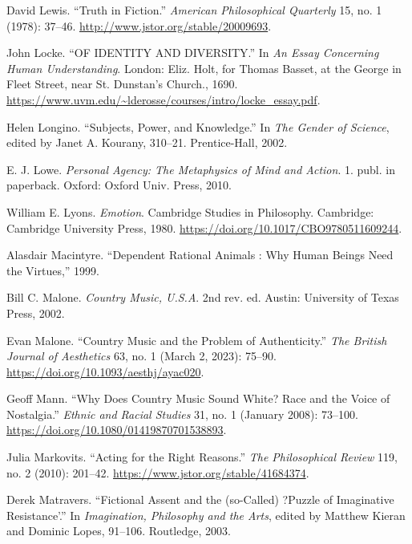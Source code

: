 \documentclass[phdthesis,12pt,final,a4paper]{wuthesis}
\newlength{\cslhangindent}
\newenvironment{CSLReferences}[2] %
{\begin{list}{}{%
	\setlength{\itemindent}{0pt}
	\setlength{\leftmargin}{0pt}
	\setlength{\parsep}{0pt}
	\ifodd #1
	\setlength{\leftmargin}{\cslhangindent}
	\setlength{\itemindent}{-1\cslhangindent}
	\fi
	\setlength{\itemsep}{#2\baselineskip}}}
{\end{list}}
\theoremstyle{definition}
\theoremstyle{definition}
\theoremstyle{definition}
\theoremstyle{definition}
\theoremstyle{remark}
\begin{document}
\begin{CSLReferences}{1}{0}
David Lewis. {``Truth in {Fiction}.''} \emph{American Philosophical Quarterly} 15, no. 1 (1978): 37--46. \url{http://www.jstor.org/stable/20009693}.

John Locke. {``{OF IDENTITY AND DIVERSITY}.''} In \emph{An {Essay Concerning Human Understanding}}. London: Eliz. Holt, for Thomas Basset, at the George in Fleet Street, near St. Dunstan's Church., 1690. \url{https://www.uvm.edu/~lderosse/courses/intro/locke_essay.pdf}.

Helen Longino. {``Subjects, {Power}, and {Knowledge}.''} In \emph{The {Gender} of {Science}}, edited by Janet A. Kourany, 310--21. Prentice-Hall, 2002.

E. J. Lowe. \emph{Personal Agency: The Metaphysics of Mind and Action}. 1. publ. in paperback. Oxford: Oxford Univ. Press, 2010.

William E. Lyons. \emph{Emotion}. Cambridge Studies in Philosophy. Cambridge: Cambridge University Press, 1980. \url{https://doi.org/10.1017/CBO9780511609244}.

Alasdair Macintyre. {``Dependent Rational Animals : Why Human Beings Need the Virtues,''} 1999.

Bill C. Malone. \emph{Country Music, {U}.{S}.{A}}. 2nd rev. ed. Austin: University of Texas Press, 2002.

Evan Malone. {``Country {Music} and the {Problem} of {Authenticity}.''} \emph{The British Journal of Aesthetics} 63, no. 1 (March 2, 2023): 75--90. \url{https://doi.org/10.1093/aesthj/ayac020}.

Geoff Mann. {``Why Does Country Music Sound White? {Race} and the Voice of Nostalgia.''} \emph{Ethnic and Racial Studies} 31, no. 1 (January 2008): 73--100. \url{https://doi.org/10.1080/01419870701538893}.

Julia Markovits. {``Acting for the {Right Reasons}.''} \emph{The Philosophical Review} 119, no. 2 (2010): 201--42. \url{https://www.jstor.org/stable/41684374}.

Derek Matravers. {``Fictional {Assent} and the (so-{Called}) ?{Puzzle} of {Imaginative Resistance}'.''} In \emph{Imagination, {Philosophy} and the {Arts}}, edited by Matthew Kieran and Dominic Lopes, 91--106. Routledge, 2003.


\end{CSLReferences}
\end{document}
